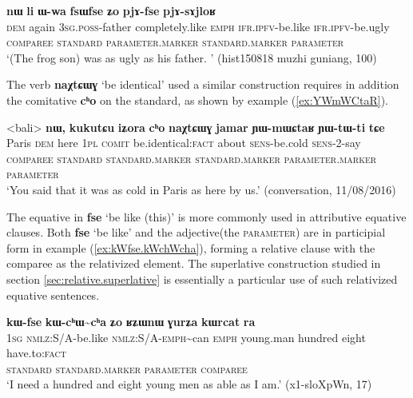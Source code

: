 \documentclass[oneside,a4paper,11pt]{article}
\newcommand{\ipa}[1]{{\phon\textbf{#1}}} %
\newcommand{\forme}[2]{\ipa{#1} `#2'}
\newcommand{\rdp}{\textasciitilde{}}
\begin{document}
\begin{exe}
\ex \label{ex:fsWfse}
\glll
\ipa{nɯ} 	\ipa{li} 	\ipa{ɯ-wa} 	\ipa{fsɯfse} 	\ipa{ʑo} 	\ipa{pjɤ-fse} 	\ipa{pjɤ-sɤjloʁ} \\
\textsc{dem} again \textsc{3sg.poss}-father completely.like \textsc{emph} \textsc{ifr.ipfv}-be.like \textsc{ifr.ipfv}-be.ugly \\
\textsc{comparee} { } \textsc{standard} \textsc{parameter.marker} { } \textsc{standard.marker} \textsc{parameter} \\
\glt `(The frog son) was as ugly as his father. ' (hist150818 muzhi guniang, 100)
\end{exe}

The verb \forme{naχtɕɯɣ}{be identical} used a similar construction requires in addition the comitative \ipa{cʰo} on the standard, as shown by example (\ref{ex:YWmWCtaR}).

\begin{exe}
\ex \label{ex:YWmWCtaR}
\glll 
<bali> 	\ipa{nɯ,} 	{\ipa{kukutɕu} \ipa{iʑora}} 	\ipa{cʰo} 	\ipa{naχtɕɯɣ} 	\ipa{jamar} 	\ipa{ɲɯ-mɯɕtaʁ} 	\ipa{ɲɯ-tɯ-ti} 	\ipa{tɕe} \\
Paris \textsc{dem} {here \textsc{1pl}} \textsc{comit} be.identical:\textsc{fact} about \textsc{sens}-be.cold \textsc{sens}-2-say \\
\textsc{comparee} { }  \textsc{standard} \textsc{standard.marker} \textsc{standard.marker}  \textsc{parameter.marker} \textsc{parameter} \\
\glt `You said that it was as cold in Paris as here by us.' (conversation, 11/08/2016)
\end{exe}

The equative in \forme{fse}{be like (this)} is more commonly used in attributive equative clauses. Both \forme{fse}{be like} and the adjective(the \textsc{parameter}) are in participial form in  example (\ref{ex:kWfse.kWchWcha}), forming a relative clause with the comparee as the relativized element. The superlative construction studied in section \ref{sec:relative.superlative} is essentially a particular use of such relativized equative sentences.

\begin{exe}
\ex \label{ex:kWfse.kWchWcha}
\glll \ipa{aʑo} 	\ipa{kɯ-fse} 	\ipa{kɯ-cʰɯ\rdp{}cʰa} 	\ipa{ʑo} 	\ipa{ʁʑɯnɯ} 	\ipa{ɣurʑa} 	\ipa{kɯrcat} 	\ipa{ra}  \\
\textsc{1sg} \textsc{nmlz}:S/A-be.like \textsc{nmlz}:S/A-\textsc{emph}\rdp{}can \textsc{emph} young.man hundred eight have.to:\textsc{fact} \\
\textsc{standard} \textsc{standard.marker} \textsc{parameter} { } \textsc{comparee} \\
\glt `I need a hundred and eight young men as able as I am.' (x1-sloXpWn, 17)
\end{exe}
\end{document}

